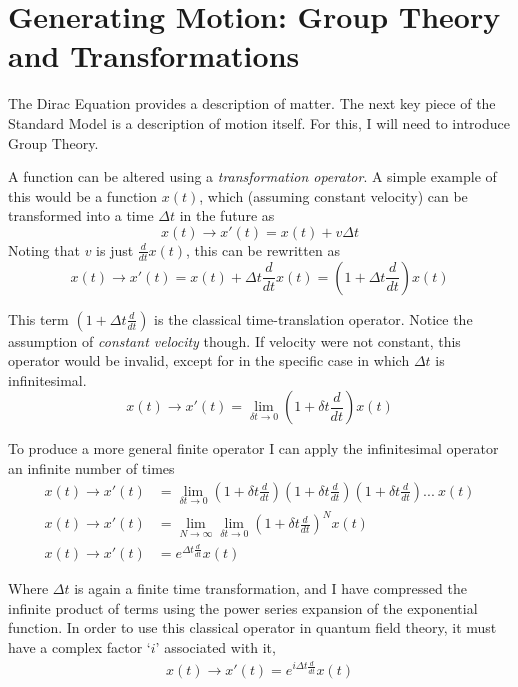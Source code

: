 \section{Generating Motion: Group Theory and Transformations}

    The Dirac Equation provides a description of matter.
    The next key piece of the Standard Model is a description of motion itself.
    For this, I will need to introduce Group Theory.

    A function can be altered using a \textit{transformation operator}.
    A simple example of this would be a function $x(t)$, 
        which (assuming constant velocity) can be transformed into a time $\Delta t$ in the future as
    \begin{equation}
    x(t) \rightarrow x'(t) = x(t) + v \Delta t
    \end{equation}
    Noting that $v$ is just $\frac{d}{dt} x(t)$, this can be rewritten as
    \begin{equation}
    x(t) \rightarrow x'(t) = x(t) + \Delta t \frac{d}{dt} x(t) = \left(1+\Delta t \frac{d}{dt}\right) x(t)
    \end{equation}

    This term $\left(1+\Delta t \frac{d}{dt}\right)$ is the classical time-translation operator.
    Notice the assumption of \textit{constant velocity} though.
    If velocity were not constant, this operator would be invalid, except for in the specific case in which $\Delta t$ is infinitesimal.
    \begin{equation}
    x(t) \rightarrow x'(t) = \lim_{\delta t \to 0} \left(1+\delta t \frac{d}{dt}\right) x(t)
    \end{equation}

    To produce a more general finite operator I can apply the infinitesimal operator an infinite number of times
    \begin{equation} \begin{split}
    x(t) \rightarrow x'(t) &= \lim_{\delta t \to 0} \left(1+\delta t \frac{d}{dt}\right)\left(1+\delta t \frac{d}{dt}\right)\left(1+\delta t \frac{d}{dt}\right)...\ x(t)
    \\x(t) \rightarrow x'(t) &= \lim_{N \to \infty} \lim_{\delta t \to 0} \left(1+\delta t \frac{d}{dt}\right)^N x(t)
    \\x(t) \rightarrow x'(t) &= e^{\Delta t \frac{d}{dt}} x(t)
    \end{split} \end{equation}

    Where $\Delta t$ is again a finite time transformation,
        and I have compressed the infinite product of terms using the power series expansion of the exponential function.
    In order to use this classical operator in quantum field theory, it must have a complex factor `$i$' associated with it,
    \begin{equation} \begin{split}
    x(t) \rightarrow x'(t) = e^{i\Delta t \frac{d}{dt}} x(t)
    \end{split} \end{equation}

